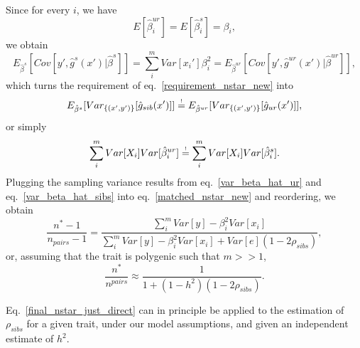 \documentclass[hidelinks, 12pt]{article}
\begin{document}
Since for every $i$, we have 
$$E[\hat{\beta}_i^{ur}]=E[\hat{\beta}_i^{s}]=\beta_i,$$ 
we obtain
$$E_{\hat{\beta}^{s}}[Cov[y',\hat{g}^{s}(x')|\hat{\beta}^{s}]]=\sum_i^mVar[x_i']\beta_i^2=E_{\hat{\beta}^{ur}}[Cov[y',\hat{g}^{ur}(x')|\hat{\beta}^{ur}]],$$
which turns the requirement of eq.~\ref{requirement_nstar_new} into
$$E_{\hat{\beta}^s}[Var_{\{(x',y')\}}[\hat{g}_{sib}(x')]] \reqeq E_{\hat{\beta}^{ur}}[Var_{\{(x',y')\}}[\hat{g}_{ur}(x')]],$$
or simply
\begin{equation}
\label{matched_nstar_new}
\sum_i^mVar[X_i]Var[\hat{\beta}_i^{ur}] \reqeq \sum_i^mVar[X_i]Var[\hat{\beta}_i^{s}].
\end{equation}
Plugging the sampling variance results from eq.~\ref{var_beta_hat_ur} and eq.~\ref{var_beta_hat_sibs} into eq.~\ref{matched_nstar_new} and reordering, we obtain 
$$\frac{n^*-1}{n_{pairs}-1} = \frac{\sum_i^m Var[y]-\beta_i^2Var[x_i]}{\sum_i^m Var[y]-\beta_i^2Var[x_i]+Var[e](1-2 \rho_{sibs})},$$
or, assuming that the trait is polygenic such that $m>>1$, 
\begin{equation}
\label{final_nstar_just_direct}
\frac{n^*}{n^{pairs}} \approx \frac{1}{1+(1-h^2)(1-2\rho_{sibs})}.
\end{equation}

Eq.~\ref{final_nstar_just_direct} can in principle be applied to the estimation of $\rho_{sibs}$ for a given trait, under our model assumptions, and given an independent estimate of $h^2.$
\end{document}
